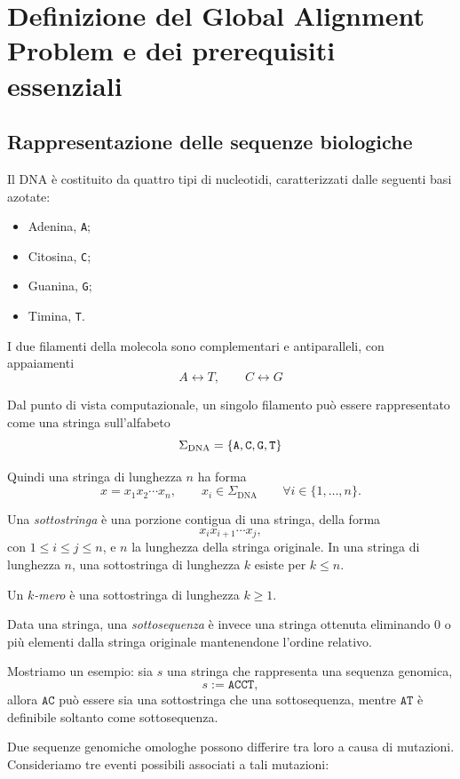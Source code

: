\section{Definizione del Global Alignment Problem e dei prerequisiti essenziali}

\subsection{Rappresentazione delle sequenze biologiche}

Il DNA è costituito da quattro tipi di nucleotidi, caratterizzati dalle seguenti basi azotate:
\begin{itemize}
    \item Adenina, \texttt{A};
    \item Citosina, \texttt{C};
    \item Guanina, \texttt{G};
    \item Timina, \texttt{T}.
\end{itemize}
I due filamenti della molecola sono complementari e antiparalleli, con appaiamenti
\[
    A \longleftrightarrow T, \qquad C \longleftrightarrow G
\]

Dal punto di vista computazionale, un singolo filamento può essere rappresentato come una stringa sull'alfabeto
\[
    \Sigma_{\text{DNA}} = \{\tt{A},\tt{C},\tt{G},\tt{T}\}
\]

Quindi una stringa di lunghezza $n$ ha forma
\[
    x=x_1x_2\cdots x_n,\qquad x_i\in\Sigma_{\text{DNA}}\qquad \forall i \in\{1,\ldots,n\}.
\]

Una \emph{sottostringa} è una porzione contigua di una stringa, della forma
\[
    x_{i} x_{i+1} \cdots  x_{j},
\]
con $1 \leq i \leq j \leq n$, e $n$ la lunghezza della stringa originale.
In una stringa di lunghezza $n$, una sottostringa di lunghezza $k$ esiste per $k \leq n$.

Un \emph{$k$-mero} è una sottostringa di lunghezza $k\geq1$.

Data una stringa, una \emph{sottosequenza} è invece una stringa ottenuta eliminando 0 o più elementi dalla stringa originale mantenendone l'ordine relativo.

Mostriamo un esempio: sia $s$ una stringa che rappresenta una sequenza genomica,
\[
    s:= \texttt{ACCT},
\]
allora $\texttt{AC}$ può essere sia una sottostringa che una sottosequenza, mentre $\texttt{AT}$ è definibile soltanto come sottosequenza.

Due sequenze genomiche omologhe possono differire tra loro a causa di mutazioni. Consideriamo tre eventi possibili associati a tali mutazioni:

